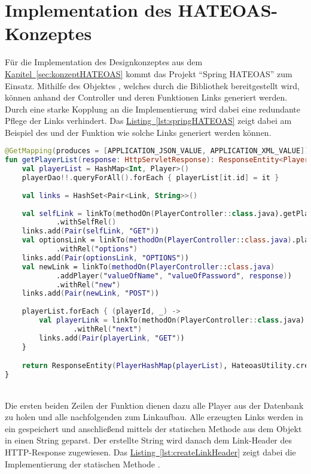 \section{Implementation des HATEOAS-Konzeptes}
Für die Implementation des Designkonzeptes aus dem \hyperref[sec:konzeptHATEOAS]{Kapitel~\ref{sec:konzeptHATEOAS}} kommt das Projekt \enquote{Spring HATEOAS} zum Einsatz. Mithilfe des Objektes , welches durch die Bibliothek bereitgestellt wird, können anhand der Controller und deren Funktionen Links generiert werden. Durch eine starke Kopplung an die Implementierung wird dabei eine redundante Pflege der Links verhindert. Das \hyperref[lst:springHATEOAS]{Listing~\ref{lst:springHATEOAS}} zeigt dabei am Beispiel des  und der Funktion  wie solche Links generiert werden können.\\
\begin{lstlisting}[style=lstStyleFramed, language=Kotlin, caption={Linkaufbau mithilfe des Projektes \enquote{Spring HATEOAS}}, label=lst:springHATEOAS, float]
@GetMapping(produces = [APPLICATION_JSON_VALUE, APPLICATION_XML_VALUE])
fun getPlayerList(response: HttpServletResponse): ResponseEntity<PlayerHashMap> {
	val playerList = HashMap<Int, Player>()
	playerDao!!.queryForAll().forEach { playerList[it.id] = it }
	
	val links = HashSet<Pair<Link, String>>()
	
	val selfLink = linkTo(methodOn(PlayerController::class.java).getPlayerList(response))
			.withSelfRel()
	links.add(Pair(selfLink, "GET"))
	val optionsLink = linkTo(methodOn(PlayerController::class.java).playerOptions(response))
			.withRel("options")
	links.add(Pair(optionsLink, "OPTIONS"))
	val newLink = linkTo(methodOn(PlayerController::class.java)
			.addPlayer("valueOfName", "valueOfPassword", response))
			.withRel("new")
	links.add(Pair(newLink, "POST"))
	
	playerList.forEach { (playerId, _) ->
		val playerLink = linkTo(methodOn(PlayerController::class.java).getPlayerById(playerId, response))
				.withRel("next")
		links.add(Pair(playerLink, "GET"))
	}

	return ResponseEntity(PlayerHashMap(playerList), HateoasUtility.createLinkHeader(links), OK)
}
\end{lstlisting}
\\
Die ersten beiden Zeilen der Funktion dienen dazu alle Player aus der Datenbank zu holen und alle nachfolgenden zum Linkaufbau. Alle erzeugten Links werden in ein  gespeichert und anschließend mittels der statischen Methode  aus dem Objekt  in einen String geparst. Der erstellte String wird danach dem Link-Header des \gls{HTTP}-Response zugewiesen. Das \hyperref[lst:createLinkHeader]{Listing~\ref{lst:createLinkHeader}} zeigt dabei die Implementierung der statischen Methode .\\
